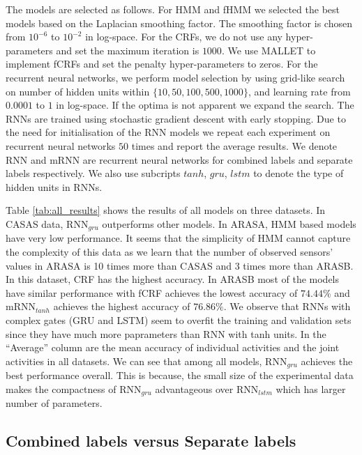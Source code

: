 The models are selected as follows. For HMM and fHMM we selected the best models based on the Laplacian smoothing factor. The smoothing factor is chosen from $10^{-6}$ to $10^{-2}$ in log-space. For the CRFs, we do not use any hyper-parameters and set the maximum iteration is $1000$. We use MALLET to implement fCRFs and set the penalty hyper-parameters to zeros. For the recurrent neural networks, we perform model selection by using grid-like search on number of hidden units within $\{10,50,100,500,1000\}$, and learning rate from $0.0001$ to $1$ in log-space. If the optima is not apparent we expand the search. The RNNs are trained using stochastic gradient descent with early stopping. Due to the need for initialisation of the RNN models we repeat each experiment on recurrent neural networks $50$ times and report the average results. We denote RNN and mRNN are recurrent neural networks for combined labels and separate labels respectively. We also use subcripts $tanh$, $gru$, $lstm$ to denote the type of hidden units in RNNs.

Table \ref{tab:all_results} shows the results of all models on three
datasets. In CASAS data, RNN$_{gru}$ outperforms other models. In
ARASA, HMM based models have very low performance. It seems that the
simplicity of HMM cannot capture the complexity of this data as we
learn that the number of observed sensors' values in ARASA is 10 times
more than CASAS and 3 times more than ARASB. In this dataset, CRF has
the highest accuracy. In ARASB most of the models have similar
performance with fCRF achieves the lowest accuracy of $74.44\%$ and
mRNN$_{tanh}$ achieves the highest accuracy of $76.86\%$. We observe
that RNNs with complex gates (GRU and LSTM) seem to overfit the
training and validation sets since they have much more paprameters
than RNN with tanh units. In the ``Average'' column are the mean
accuracy of individual activities and the joint activities in all
datasets. We can see that among all models, RNN$_{gru}$ achieves the
best performance overall. This is because, the small size of the
experimental data makes the compactness of RNN$_{gru}$ advantageous
over RNN$_{lstm}$ which has larger number of parameters.
\subsection{Combined labels versus Separate labels}

